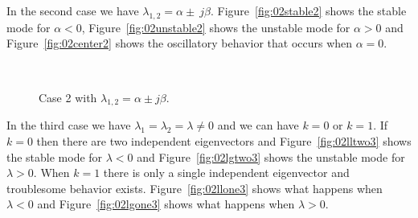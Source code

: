 In the second case we have $\lambda_{1,2}=\alpha\pm\ j\beta$. Figure~\ref{fig:02stable2} shows the stable mode for $\alpha<0$, Figure~\ref{fig:02unstable2} shows the unstable mode for $\alpha>0$ and Figure~\ref{fig:02center2} shows the oscillatory behavior that occurs when $\alpha=0$.

\begin{figure}[ht!]
\centering
{} \hfill
{} \\
\caption{Case 2 with $\lambda_{1,2} = \alpha\pm j\beta$.}
\label{fig:02case2}
\end{figure}

In the third case we have $\lambda_1=\lambda_2=\lambda\neq0$ and we can have $k=0$ or $k=1$. If $k=0$ then there are two independent eigenvectors and Figure~\ref{fig:02lltwo3} shows the stable mode for $\lambda<0$ and Figure~\ref{fig:02lgtwo3} shows the unstable mode for $\lambda>0$. When $k=1$ there is only a single independent eigenvector and troublesome behavior exists. Figure~\ref{fig:02llone3} shows what happens when $\lambda<0$ and Figure~\ref{fig:02lgone3} shows what happens when $\lambda>0$.


